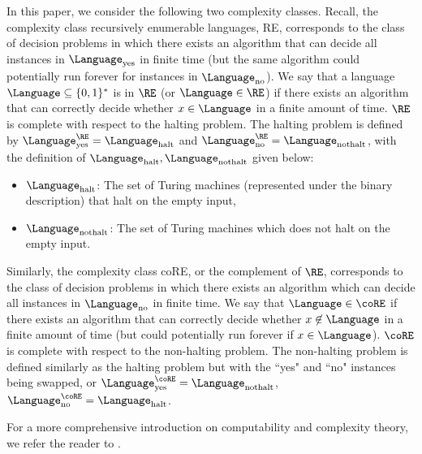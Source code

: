 In this paper, we consider the following two complexity classes. Recall, the complexity class recursively enumerable languages, \gls{RE}, corresponds to the class of decision problems in which there exists an algorithm that can decide all instances in $\Language_{\text{yes}}$ in finite time (but the same algorithm could potentially run forever for instances in $\Language_{\text{no}}$). We say that a language $\Language \subseteq \{0,1\}^*$ is in $\RE$ (or $\Language \in \RE$) if there exists an algorithm that can correctly decide whether $x \in \Language$ in a finite amount of time. $\RE$ is complete with respect to the halting problem. The halting problem is defined by $\Language_{\text{yes}}^{\RE} = \Language_{\text{halt}}$ and $\Language_{\text{no}}^{\RE} = \Language_{\text{nothalt}}$, with the definition of $\Language_{\text{halt}}, \Language_{\text{nothalt}}$ given below:
\begin{itemize}
	\item $\Language_{\text{halt}}$: The set of Turing machines (represented under the binary description) that halt on the empty input,
	\item $\Language_{\text{nothalt}}$: The set of Turing machines which does not halt on the empty input.
\end{itemize}
Similarly, the complexity class \gls{coRE}, or the complement of $\RE$, corresponds to the class of decision problems in which there exists an algorithm which can decide all instances in $\Language_{\text{no}}$ in finite time. We say that $\Language \in \coRE$ if there exists an algorithm that can correctly decide whether $x \not\in \Language$ in a finite amount of time (but could potentially run forever if $x \in \Language$). $\coRE$ is complete with respect to the non-halting problem. The non-halting problem is defined similarly as the halting problem but with the ``yes" and ``no" instances being swapped, or $\Language_{\text{yes}}^{\coRE} =  \Language_{\text{nothalt}}$, $\Language_{\text{no}}^{\coRE} =  \Language_{\text{halt}}$. 


For a more comprehensive introduction on computability and complexity theory, we refer the reader to \cite{sipserIntroductionTheoryComputation2006}.


